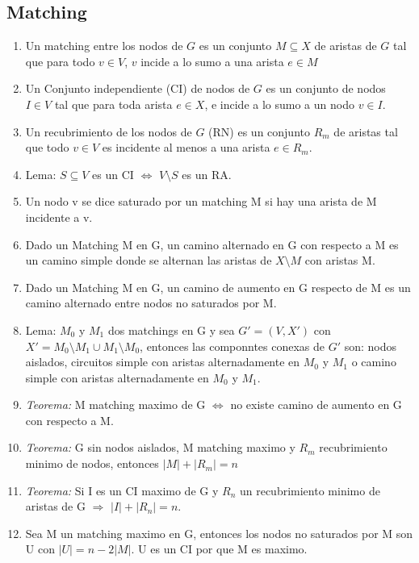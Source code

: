 \documentclass[a4paper, 11pt]{article}
\begin{document}
\subsection{Matching}
\begin{enumerate}
\item Un matching entre los nodos de $G$ es un conjunto $M \subseteq X$ de aristas de $G$ tal que para todo $v \in V$, $v$ incide a lo sumo a una arista $e \in M$
\item Un Conjunto independiente (CI) de nodos de $G$ es un conjunto de nodos $I \in V$ tal que para toda arista $e \in X$, e incide a lo sumo a un nodo $v \in I$.
\item Un recubrimiento de los nodos de $G$ (RN) es un conjunto $R_{m}$ de aristas tal que todo $v \in V$ es incidente al menos a una arista $e \in R_{m}$.
\item Lema: $S \subseteq V$ es un CI $\iff$ $V \setminus S$ es un RA.
\item Un nodo v se dice saturado por un matching M si hay una arista de M incidente a v.
\item Dado un Matching M en G, un camino alternado en G con respecto a M es un camino simple donde se alternan las aristas de $X \setminus M$ con aristas M.
\item Dado un Matching M en G, un camino de aumento en G respecto de M es un camino alternado entre nodos no saturados por M.
\item Lema: $M_{0}$ y $M_{1}$ dos matchings en G y sea $G'=(V,X')$ con $X'=M_{0} \setminus M_{1} \cup M_{1} \setminus M_{0}$, entonces las componntes conexas de $G'$ son: nodos aislados, circuitos simple con aristas alternadamente en $M_{0}$ y $M_{1}$ o camino simple con aristas alternadamente en $M_{0}$ y $M_{1}$.
\item \textit{Teorema:} M matching maximo de G $\iff$ no existe camino de aumento en G con respecto a M.
\item \textit{Teorema:} G sin nodos aislados, M matching maximo y $R_{m}$ recubrimiento minimo de nodos, entonces $|M|+|R_{m}|=n$
\item \textit{Teorema:} Si I es un CI maximo de G y $R_{n}$ un recubrimiento minimo de aristas de G $\Rightarrow$ $|I|+|R_{n}|=n$.
\item Sea M un matching maximo en G, entonces los nodos no saturados por M son U con $|U|=n-2|M|$. U es un CI por que M es maximo.
\end{enumerate}
\end{document}
